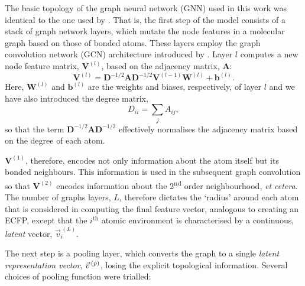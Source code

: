 The basic topology of the graph neural network (GNN) used in this work was identical to the one used by \citet{qinPredictingCriticalMicelle2021}. That is, the first step of the model consists of a stack of graph network layers, which mutate the node features in a molecular graph based on those of bonded atoms.
These layers employ the graph convolution network (GCN) architecture introduced by \cite{kipfSemiSupervisedClassificationGraph2017a}. Layer $l$ computes a new node feature matrix, $\mathbf{V}^{(l)}$, based on the adjacency matrix, $\mathbf{A}$:
\begin{equation}
    \mathbf{V}^{(l)} = \mathbf{D}^{-1/2} \mathbf{A} \mathbf{D}^{-1/2} \mathbf{V}^{(l-1)} \mathbf{W}^{(l)} + \mathbf{b}^{(l)}.
\end{equation}
Here, $\mathbf{W}^{(l)}$ and $\mathbf{b}^{(l)}$ are the weights and biases,
respectively, of layer $l$ and we have also introduced the degree matrix,
\begin{equation}
    D_{ii} = \sum_j A_{ij},
\end{equation}
so that the term $\mathbf{D}^{-1/2} \mathbf{A}
    \mathbf{D}^{-1/2}$ effectively normalises the adjacency matrix based on
the degree of each atom.

$\mathbf{V}^{(1)}$, therefore, encodes not only information about the atom itself but its bonded neighbours. This information is used in the subsequent graph convolution so that $\mathbf{V}^{(2)}$ encodes information about the
2\textsuperscript{nd} order neighbourhood, \emph{et cetera}. The number of graphs layers, $L$, therefore dictates the `radius' around each atom that is considered in computing the final feature vector, analogous to creating an ECFP, except that the $i^\text{th}$ atomic environment is characterised by a continuous, \emph{latent} vector, $\vec{v}^{\,(L)}_i$.

The next step is a pooling layer, which converts the graph to a single \emph{latent representation vector}, $\vec{v}^{\,(p)}{}$, losing the explicit topological information. Several choices of pooling function were trialled:


